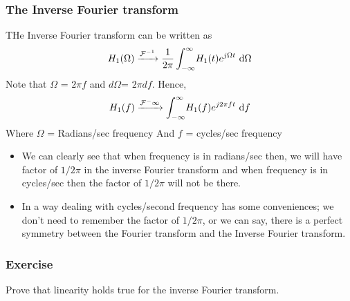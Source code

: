 	\subsubsection{The Inverse Fourier transform}
		THe Inverse Fourier transform can be written as
		\begin{equation}
			H_1(\Omega) \xrightarrow{\mathcal{F}^{-1}} \frac{1}{2\pi} \int_{-\infty}^{\infty} \! H_1(t) e^{j\Omega t} \ \mathrm{d} \Omega
		\end{equation}
		Note that $\Omega$ = $2\pi f$ and $d\Omega$= $2\pi df$. Hence,
		\begin{equation}
			H_1(f) \xrightarrow{\mathcal{F^-1}} \int_{-\infty}^{\infty} \! H_1(f) e^{j2\pi ft} \ \mathrm{d} f
		\end{equation}
		Where $\Omega$ =  Radians/sec frequency
		And $f$ = cycles/sec frequency
		\begin{itemize}
			\item We can clearly see that when frequency is in radians/sec then, we will have factor of $1/2\pi$ in the inverse Fourier transform and when frequency is in cycles/sec then the factor of $1/2\pi$ will not be there.
			\item In a way dealing with cycles/second frequency has some conveniences; we don't need to remember the factor of $1/2\pi$, or we can say, there is a perfect symmetry between the Fourier transform and the Inverse Fourier transform.
		\end{itemize}

	\subsubsection{Exercise}
		 Prove that linearity holds true for the inverse Fourier transform.

